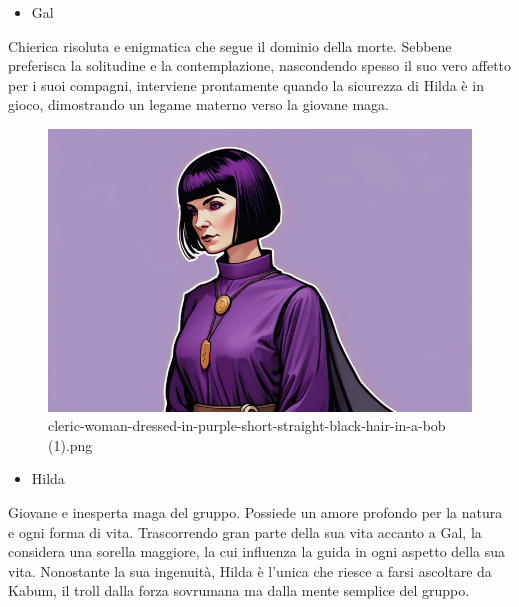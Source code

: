 \begin{itemize}
\tightlist
\item
  Gal
\end{itemize}

Chierica risoluta e enigmatica che segue il dominio della morte. Sebbene
preferisca la solitudine e la contemplazione, nascondendo spesso il suo
vero affetto per i suoi compagni, interviene prontamente quando la
sicurezza di Hilda è in gioco, dimostrando un legame materno verso la
giovane maga.

\begin{figure}
\centering
\includegraphics{cleric-woman-dressed-in-purple-short-straight-black-hair-in-a-bob_(1).png}
\caption{cleric-woman-dressed-in-purple-short-straight-black-hair-in-a-bob
(1).png}
\end{figure}

\begin{itemize}
\tightlist
\item
  Hilda
\end{itemize}

Giovane e inesperta maga del gruppo. Possiede un amore profondo per la
natura e ogni forma di vita. Trascorrendo gran parte della sua vita
accanto a Gal, la considera una sorella maggiore, la cui influenza la
guida in ogni aspetto della sua vita. Nonostante la sua ingenuità, Hilda
è l'unica che riesce a farsi ascoltare da Kabum, il troll dalla forza
sovrumana ma dalla mente semplice del gruppo.

